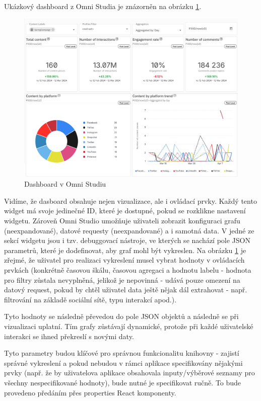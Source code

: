 \documentclass[czech, bc, kiv, he, iso690numb]{fasthesis}
\begin{document}
Ukázkový dashboard z Omni Studia je znázorněn na obrázku \ref{fig:omniStudioDashboard}.
\begin{figure}
	\centering
	\includegraphics[width=1\textwidth]{pictures/omni-studio.png}
	\caption{Dashboard v Omni Studiu}
	\label{fig:omniStudioDashboard}
\end{figure}
Vidíme, že dasboard obsahuje nejen vizualizace, ale i ovládací prvky. Každý tento widget má svoje jedinečné ID, které je dostupné, pokud se rozklikne nastavení widgetu. Zároveň Omni Studio 
umožňuje uživateli zobrazit konfiguraci grafu (neexpandované), datové requesty (neexpandované) a i samotná data. V jedné ze sekcí widgetu jsou i tzv. debuggovací nástroje, ve kterých se nachází pole JSON parametrů,
které je dodefinovat, aby graf mohl být vykreslen. Na obrázku \ref{fig:omniStudioDashboard} je zřejmé, že uživatel pro realizaci vykreslení musel vybrat hodnoty v ovládacích prvkách (konkrétně 
časovou škálu, časovou agregaci a hodnotu labelu - hodnota pro filtry zůstala nevyplněná, jelikož je nepovinná - udává pouze omezení na datový request, pokud by chtěl uživatel data ještě nějak
dál extrahovat - např. filtrování na základě sociální sítě, typu interakcí apod.). 

Tyto hodnoty se následně převedou do pole JSON objektů a následně se při vizualizaci uplatní. Tím grafy zůstávají dynamické, protože při každé uživatelské interakci se ihned překreslí s novými
daty.

Tyto parametry budou klíčové pro správnou funkcionalitu knihovny - zajistí správné vykreslení a pokud nebudou v rámci aplikace specifikovány nějakými prvky (např. že by uživatelova aplikace obsahovala
inputy/výběrové seznamy pro všechny nespecifikované hodnoty), bude nutné je specifikovat ručně. To bude provedeno předáním přes properties React komponenty.
\end{document}
